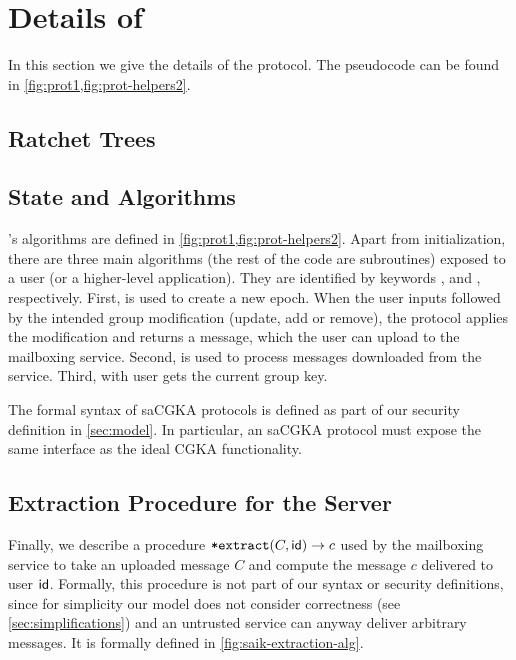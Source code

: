 
\section{Details of \saik} \label{sec:saik-details}

In this section we give the details of the \saik protocol. The pseudocode can be found in \cref{fig:prot1,fig:prot-helpers2}.

\subsection{Ratchet Trees}


\subsection{\saik State and Algorithms}


\saik's algorithms are defined in \cref{fig:prot1,fig:prot-helpers2}. Apart from initialization, there are three main algorithms (the rest of the code are subroutines) exposed to a user (or a higher-level application). They are identified by keywords ,  and , respectively. First,  is used to create a new epoch. When the user inputs  followed by the intended group modification (update, add or remove), the protocol applies the modification and returns a message, which the user can upload to the mailboxing service. Second,  is used to process messages downloaded from the service. Third, with  user gets the current group key.

The formal syntax of saCGKA protocols is defined as part of our security definition in \cref{sec:model}. In particular, an saCGKA protocol must expose the same interface as the ideal CGKA functionality.



\newcommand{\extract}{\method{extract}}
\newcommand{\getExtractionIndices}{\method{getExtractionIndices}}
\subsection{Extraction Procedure for the Server}
Finally, we describe a procedure $\extract(C, \id) \to c$ used by the mailboxing service to take an uploaded message $C$
and compute the message $c$ delivered to user ${\mathsf{id}}$. Formally, this procedure is not part of our syntax or security
definitions, since for simplicity our model does not consider correctness (see \cref{sec:simplifications}) and an
untrusted service can anyway deliver arbitrary messages. It is formally defined in \cref{fig:saik-extraction-alg}.

